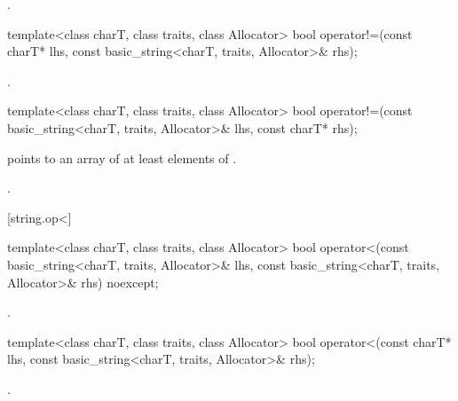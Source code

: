 \begin{itemdescr}
\pnum
\returns
{}.
\end{itemdescr}

%
\begin{itemdecl}
template<class charT, class traits, class Allocator>
  bool operator!=(const charT* lhs, const basic_string<charT, traits, Allocator>& rhs);
\end{itemdecl}

\begin{itemdescr}
\pnum
\returns
{}.
\end{itemdescr}

%
\begin{itemdecl}
template<class charT, class traits, class Allocator>
  bool operator!=(const basic_string<charT, traits, Allocator>& lhs, const charT* rhs);
\end{itemdecl}

\begin{itemdescr}
\pnum
\requires {} points to an array of at least 
elements of .

\pnum
\returns
{}.
\end{itemdescr}

[string.op<]{}

%
\begin{itemdecl}
template<class charT, class traits, class Allocator>
  bool operator<(const basic_string<charT, traits, Allocator>& lhs,
                 const basic_string<charT, traits, Allocator>& rhs) noexcept;
\end{itemdecl}

\begin{itemdescr}
\pnum
\returns
{}.
\end{itemdescr}

%
\begin{itemdecl}
template<class charT, class traits, class Allocator>
  bool operator<(const charT* lhs, const basic_string<charT, traits, Allocator>& rhs);
\end{itemdecl}

\begin{itemdescr}
\pnum
\returns
{}.
\end{itemdescr}

